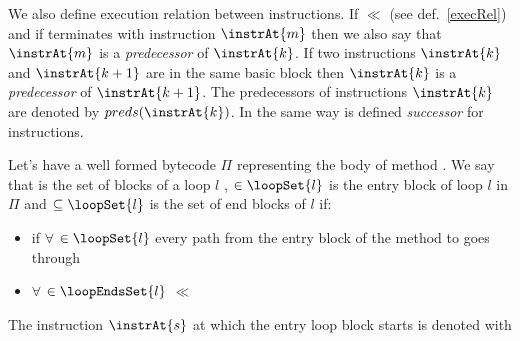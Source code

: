 \begin{defn}\label{execRelInstr}
We also  define execution relation between instructions. If
 $\ll$  (see def.~\ref{execRel}) and if
 terminates with instruction $\instrAt{m}$ then we also
say that $\instrAt{m}$ is a \textit{predecessor} of $\instrAt{k}$.
If two instructions $\instrAt{k}$ and $\instrAt{k+1}$ are in the
same basic block then $\instrAt{k}$ is a \textit{predecessor} of
$\instrAt{k+1}$. The predecessors of instructions $\instrAt{k}$
are denoted by $preds(\instrAt{k}) $. In the same way is defined
\textit{successor} for instructions.
\end{defn}


\begin{defn}\label{defLoop}
Let's have a well formed bytecode  $\Pi$ representing the body of
method \method. We say that   is the set of blocks of a
loop $l$ ,  $ \in \loopSet{l}$ is the entry block of
loop $l$ in $\Pi$ and  $ \subseteq \loopSet{l}$ is
the set of end blocks of $l$ if:
\begin{itemize}
\item if $\forall  $  $ \in  \loopSet{l}$ every path
from the entry block  of the method \method to
 goes through 


\item $\forall  $  $ \in  \loopEndsSet{l}$  
$\ll$ 
\end{itemize}
The instruction $\instrAt{s}$ at which the entry loop block
 starts is denoted with 

\end{defn}




